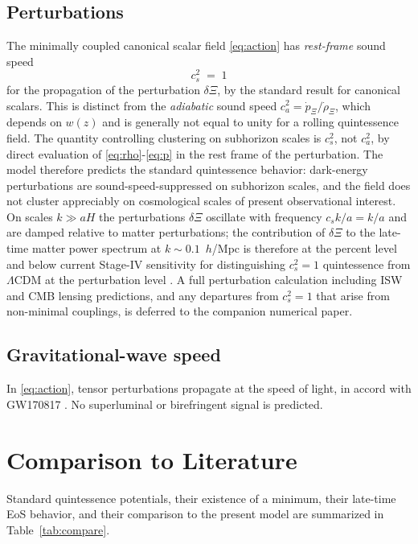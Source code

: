 \documentclass[11pt,reqno]{amsart}
\theoremstyle{plain}
\theoremstyle{definition}
\theoremstyle{remark}
\begin{document}
\subsection{Perturbations}\label{sec:perts}

The minimally coupled canonical scalar field \eqref{eq:action} has
\emph{rest-frame} sound speed
\[
  c_{s}^{2} \;=\; 1
\]
for the propagation of the perturbation $\delta\Xi$, by the standard
result for canonical scalars. This is
distinct from the \emph{adiabatic} sound speed
$c_{a}^{2} = \dot p_\Xi/\dot\rho_\Xi$, which depends on $w(z)$ and is
generally not equal to unity for a rolling quintessence field. The
quantity controlling clustering on subhorizon scales is $c_{s}^{2}$,
not $c_{a}^{2}$, by direct evaluation of \eqref{eq:rho}-\eqref{eq:p}
in the rest frame of the perturbation.
The model therefore predicts the standard quintessence behavior: dark-energy
perturbations are sound-speed-suppressed on subhorizon scales, and the
field does not cluster appreciably on cosmological scales of present
observational interest. On scales $k \gg a H$ the perturbations $\delta\Xi$
oscillate with frequency $c_s k/a = k/a$ and are damped relative to matter
perturbations; the contribution of $\delta\Xi$ to the late-time matter
power spectrum at $k \sim 0.1$~$h$/Mpc is therefore at the percent level
and below current Stage-IV sensitivity for distinguishing $c_s^{2} = 1$
quintessence from $\Lambda$CDM at the perturbation level
\cite{ShajibFrieman2025,Turyshev2026Review}. A full perturbation
calculation including ISW and CMB lensing predictions, and any departures
from $c_s^{2} = 1$ that arise from non-minimal couplings, is deferred to
the companion numerical paper.

\subsection{Gravitational-wave speed}

In \eqref{eq:action}, tensor perturbations propagate at the speed of
light, in accord with GW170817 \cite{GW170817}. No superluminal or
birefringent signal is predicted.

\section{Comparison to Literature}\label{sec:comparison}

Standard quintessence potentials, their existence of a minimum, their
late-time EoS behavior, and their comparison to the present model are
summarized in Table~\ref{tab:compare}.
\end{document}
